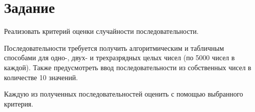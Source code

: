 \chapter{Задание}

Реализовать критерий оценки случайности последовательности. 

Последовательности требуется получить алгоритмическим и табличным способами для одно-, двух- и трехразрядных целых чисел (по 5000 чисел в каждой). Также предусмотреть ввод последовательности из собственных чисел в количестве 10 значений.

Каждую из полученных последовательностей оценить с помощью выбранного критерия.
